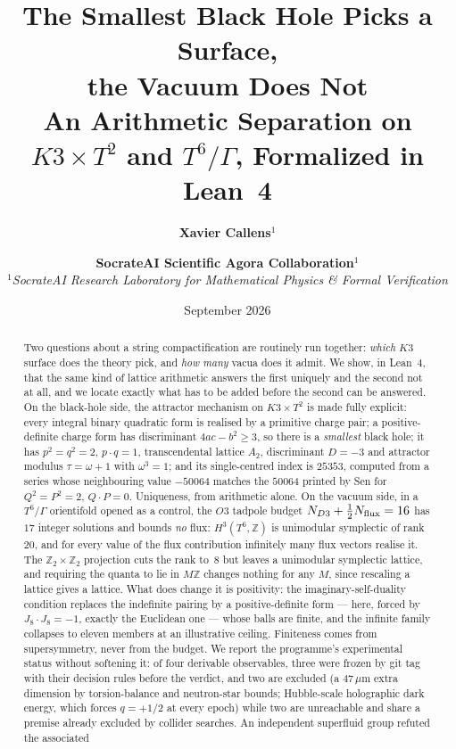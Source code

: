 \documentclass[11pt,a4paper]{article}
\title{\Huge \textbf{The Smallest Black Hole Picks a Surface,}\\[0.3em]
\LARGE \textbf{the Vacuum Does Not}\\[0.2em]
An Arithmetic Separation on $K3\times T^2$ and $T^6/\Gamma$, Formalized in Lean~4}
\author{\textbf{Xavier Callens}$^{1}$ \and \textbf{SocrateAI Scientific Agora Collaboration}$^{1}$ \\[0.5em]
$^{1}$\textit{SocrateAI Research Laboratory for Mathematical Physics \& Formal Verification}}
\date{September 2026}
\theoremstyle{remark}
\begin{document}
\maketitle

\begin{abstract}

Two questions about a string compactification are routinely run together: \emph{which} $K3$ surface does the
theory pick, and \emph{how many} vacua does it admit. We show, in Lean~4, that the same kind of lattice
arithmetic answers the first uniquely and the second not at all, and we locate exactly what has to be added
before the second can be answered. On the black-hole side, the attractor mechanism on $K3\times T^2$ is made
fully explicit: every integral binary quadratic form is realised by a primitive charge pair; a positive-definite
charge form has discriminant $4ac-b^2\ge 3$, so there is a \emph{smallest} black hole; it has
$p^2=q^2=2$, $p\cdot q=1$, transcendental lattice $A_2$, discriminant $D=-3$ and attractor modulus
$\tau=\omega+1$ with $\omega^3=1$; and its single-centred index is $25353$, computed from a series whose
neighbouring value $-50064$ matches the $50064$ printed by Sen for $Q^2=P^2=2$, $Q\cdot P=0$. Uniqueness, from
arithmetic alone. On the vacuum side, in a $T^6/\Gamma$ orientifold opened as a control, the $O3$ tadpole budget
$N_{D3}+\tfrac12 N_{\rm flux}=16$ has $17$ integer solutions and bounds \emph{no} flux: $H^3(T^6,\mathbb{Z})$ is
unimodular symplectic of rank~$20$, and for every value of the flux contribution infinitely many flux vectors
realise it. The $\mathbb{Z}_2\times\mathbb{Z}_2$ projection cuts the rank to~$8$ but leaves a unimodular
symplectic lattice, and requiring the quanta to lie in $M\mathbb{Z}$ changes nothing for any $M$, since rescaling
a lattice gives a lattice. What does change it is positivity: the imaginary-self-duality condition replaces the
indefinite pairing by a positive-definite form --- here, forced by $J_8\cdot J_8=-1$, exactly the Euclidean one
--- whose balls are finite, and the infinite family collapses to eleven members at an illustrative ceiling.
Finiteness comes from supersymmetry, never from the budget. We report the programme's experimental status
without softening it: of four derivable observables, three were frozen by git tag with their decision rules
before the verdict, and two are excluded (a $47\,\mu$m extra dimension by torsion-balance and neutron-star
bounds; Hubble-scale holographic dark energy, which forces $q=+1/2$ at every epoch) while two are unreachable and
share a premise already excluded by collider searches. An independent superfluid group refuted the associated

\end{abstract}
\end{document}
